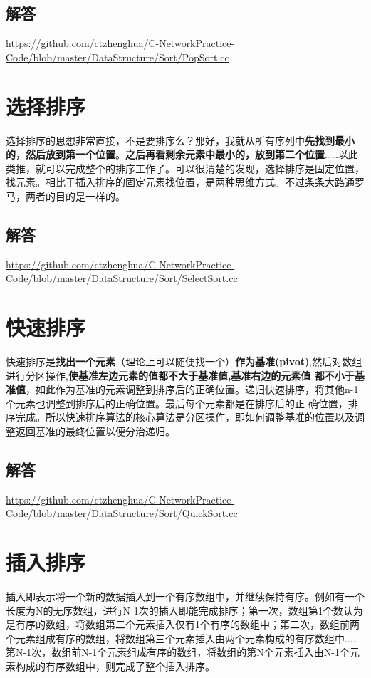 \documentclass[UTF8,a4paper,12pt]{ctexbook}
\begin{document}
	\subsection{解答}
	\url{https://github.com/ctzhenghua/C-NetworkPractice-Code/blob/master/DataStructure/Sort/PopSort.cc}
		
\section{选择排序}
	
	选择排序的思想非常直接，不是要排序么？那好，我就从所有序列中\textbf{先找到最小的}，\textbf{然后放到第一个位置}。\textbf{之后再看剩余元素中最小的，放到第二个位置}……以此类推，就可以完成整个的排序工作了。可以很清楚的发现，选择排序是固定位置，找元素。相比于插入排序的固定元素找位置，是两种思维方式。不过条条大路通罗马，两者的目的是一样的。
	
	\subsection{解答}
	\url{https://github.com/ctzhenghua/C-NetworkPractice-Code/blob/master/DataStructure/Sort/SelectSort.cc}
		
\section{快速排序}

	快速排序是\textbf{找出一个元素}（理论上可以随便找一个）\textbf{作为基准(pivot)},然后对数组进行分区操作,\textbf{使基准左边元素的值都不大于基准值,基准右边的元素值 都不小于基准值}，如此作为基准的元素调整到排序后的正确位置。递归快速排序，将其他n-1个元素也调整到排序后的正确位置。最后每个元素都是在排序后的正 确位置，排序完成。所以快速排序算法的核心算法是分区操作，即如何调整基准的位置以及调整返回基准的最终位置以便分治递归。
	
	\subsection{解答}
		\url{https://github.com/ctzhenghua/C-NetworkPractice-Code/blob/master/DataStructure/Sort/QuickSort.cc}
\section{插入排序}
	
	插入即表示将一个新的数据插入到一个有序数组中，并继续保持有序。例如有一个长度为N的无序数组，进行N-1次的插入即能完成排序；第一次，数组第1个数认为是有序的数组，将数组第二个元素插入仅有1个有序的数组中；第二次，数组前两个元素组成有序的数组，将数组第三个元素插入由两个元素构成的有序数组中......第N-1次，数组前N-1个元素组成有序的数组，将数组的第N个元素插入由N-1个元素构成的有序数组中，则完成了整个插入排序。
	
\end{document}
